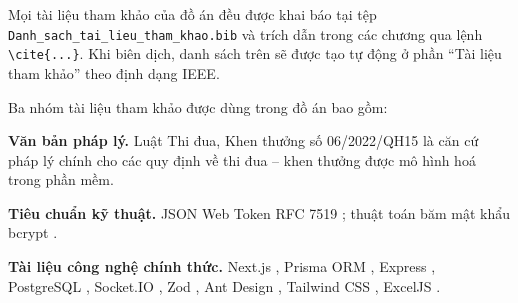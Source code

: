 \documentclass[../DoAn.tex]{subfiles}
\begin{document}
Mọi tài liệu tham khảo của đồ án đều được khai báo tại tệp \texttt{Danh\_sach\_tai\_lieu\_tham\_khao.bib} và trích dẫn trong các chương qua lệnh \texttt{\textbackslash cite\{...\}}. Khi biên dịch, danh sách trên sẽ được tạo tự động ở phần ``Tài liệu tham khảo'' theo định dạng IEEE.

Ba nhóm tài liệu tham khảo được dùng trong đồ án bao gồm:

\textbf{Văn bản pháp lý.} Luật Thi đua, Khen thưởng số 06/2022/QH15 \cite{luat062022} là căn cứ pháp lý chính cho các quy định về thi đua -- khen thưởng được mô hình hoá trong phần mềm.

\textbf{Tiêu chuẩn kỹ thuật.} JSON Web Token RFC 7519 \cite{rfc7519}; thuật toán băm mật khẩu bcrypt \cite{bcrypt}.

\textbf{Tài liệu công nghệ chính thức.} Next.js \cite{nextjsdocs}, Prisma ORM \cite{prismadocs}, Express \cite{expressdocs}, PostgreSQL \cite{pgdocs}, Socket.IO \cite{socketiodocs}, Zod \cite{zoddocs}, Ant Design \cite{antdesigndocs}, Tailwind CSS \cite{tailwinddocs}, ExcelJS \cite{exceljsdocs}.
\end{document}
